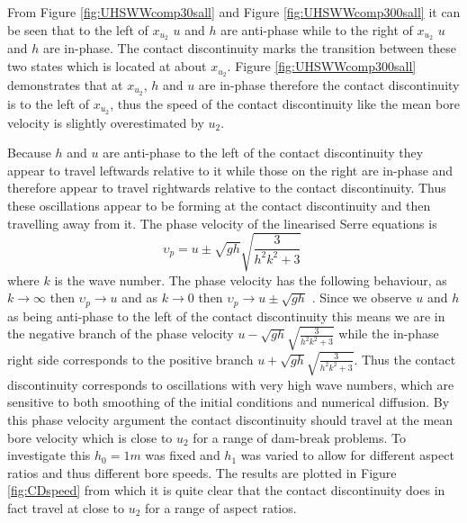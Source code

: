\documentclass[SingleSpace,12pt,Proceedings]{Serre_ASCE}
\begin{document}
From Figure \ref{fig:UHSWWcomp30sall} and Figure \ref{fig:UHSWWcomp300sall} it can be seen that to the left of $x_{u_2}$ $u$ and $h$ are anti-phase while to the right of $x_{u_2}$ $u$ and $h$ are in-phase. The contact discontinuity \cite{El-etal-2006} marks the transition between these two states which is located at about $x_{u_2}$. Figure \ref{fig:UHSWWcomp300sall} demonstrates that at $x_{u_2}$, $h$ and $u$ are in-phase therefore the contact discontinuity is to the left of $x_{u_2}$, thus the speed of the contact discontinuity like the mean bore velocity is slightly overestimated by $u_2$. 

Because $h$ and $u$ are anti-phase to the left of the contact discontinuity they appear to travel leftwards relative to it while those on the right are in-phase and therefore appear to travel rightwards relative to the contact discontinuity. Thus these oscillations appear to be forming at the contact discontinuity and then travelling away from it. The phase velocity of the linearised Serre equations is 
\[\upsilon_p = u \pm \sqrt{gh} \sqrt{\frac{3}{h^2 k^2 + 3}} \; \]
where $k$ is the wave number. The phase velocity has the following behaviour, as $k \rightarrow \infty$ then $\upsilon_p \rightarrow u$ and as $k \rightarrow 0$ then $\upsilon_p \rightarrow u \pm \sqrt{gh}$ . Since we observe $u$ and $h$ as being anti-phase to the left of the contact discontinuity this means we are in the negative branch of the phase velocity $u - \sqrt{gh} \sqrt{\frac{3}{h^2 k^2 + 3}}$ while the in-phase right side corresponds to the positive branch  $u + \sqrt{gh} \sqrt{\frac{3}{h^2 k^2 + 3}}$. Thus the contact discontinuity corresponds to oscillations with very high wave numbers, which are sensitive to both smoothing of the initial conditions and numerical diffusion.
By this phase velocity argument the contact discontinuity should travel at the mean bore velocity which is close to $u_2$ for a range of dam-break problems. To investigate this $h_0=1m$ was fixed and $h_1$ was varied to allow for different aspect ratios and thus different bore speeds. The results are plotted in Figure \ref{fig:CDspeed} from which it is quite clear that the contact discontinuity does in fact travel at close to $u_2$ for a range of aspect ratios. 
\end{document}
